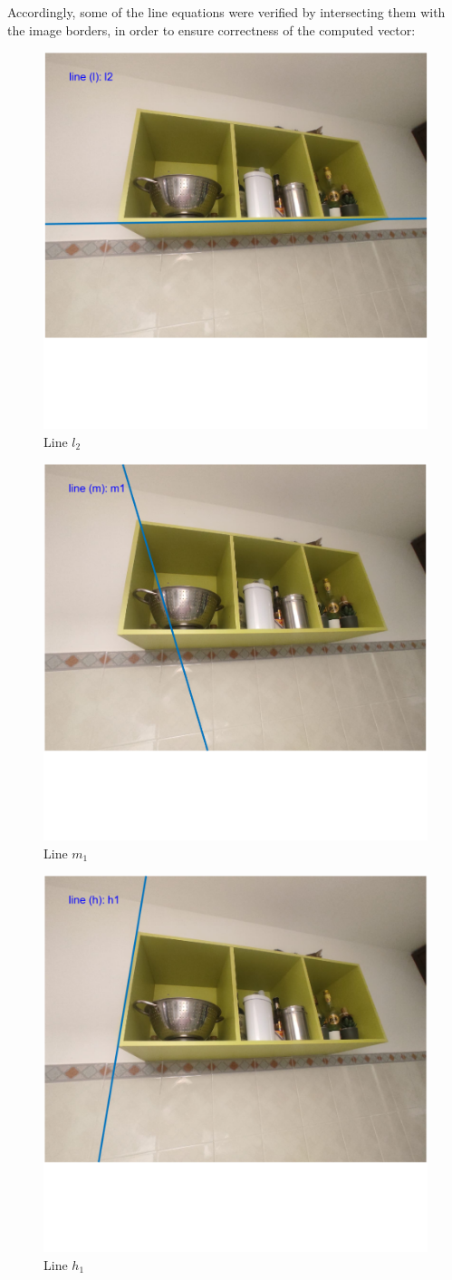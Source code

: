 \documentclass{Configuration_Files/PoliMi3i_thesis}
\begin{document}
Accordingly, some of the line equations were verified by intersecting them with the image borders, in order to ensure correctness of the computed vector:
\begin{figure}[H]
    \centering
    \includegraphics[width=0.5\linewidth]{Project Template/Images/l2.png}
    \caption{Line $l_2$}
    \label{fig:enter-label}
\end{figure}

\begin{figure}[H]
    \centering
    \includegraphics[width=0.5\linewidth]{Project Template/Images/m1.png}
    \caption{Line $m_1$}
    \label{fig:enter-label}
\end{figure}

\begin{figure}[H]
    \centering
    \includegraphics[width=0.5\linewidth]{Project Template/Images/h1.png}
    \caption{Line $h_1$}
    \label{fig:enter-label}
\end{figure}
\end{document}
